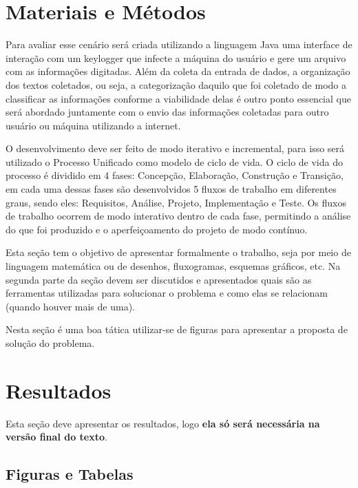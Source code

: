 \documentclass[applsci,article,submit,pdftex,moreauthors]{Definitions/mdpi}
\begin{document}



\section{Materiais e Métodos}

Para avaliar esse cenário será criada utilizando a linguagem Java uma interface de interação com um keylogger que infecte a máquina do usuário e gere um arquivo com as informações digitadas. Além da coleta da entrada de dados, a organização dos textos coletados, ou seja, a categorização daquilo que foi coletado de modo a classificar as informações conforme a viabilidade delas é outro ponto essencial que será abordado juntamente com o envio das informações coletadas para outro usuário ou máquina utilizando a internet.

O desenvolvimento deve ser feito de modo iterativo e incremental, para isso será utilizado o Processo Unificado como modelo de ciclo de vida. O ciclo de vida do processo é dividido em 4 fases: Concepção, Elaboração, Construção e Transição, em cada uma dessas fases são desenvolvidos 5 fluxos de trabalho em diferentes graus, sendo eles: Requisitos, Análise, Projeto, Implementação e Teste. Os fluxos de trabalho ocorrem de modo interativo dentro de cada fase, permitindo a análise do que foi produzido e o aperfeiçoamento do projeto de modo contínuo. 


Esta seção tem o objetivo de apresentar formalmente o trabalho, seja por meio de linguagem matemática ou de desenhos, fluxogramas, esquemas gráficos, etc. Na segunda parte da seção devem ser discutidos e apresentados quais são as ferramentas utilizadas para solucionar o problema e como elas se relacionam (quando houver mais de uma).

Nesta seção é uma boa tática utilizar-se de figuras para apresentar a proposta de solução do problema.

\section{Resultados}

Esta seção deve apresentar os resultados, logo \textbf{ela só será necessária na versão final do texto}.

\subsection{Figuras e Tabelas}
\end{document}
